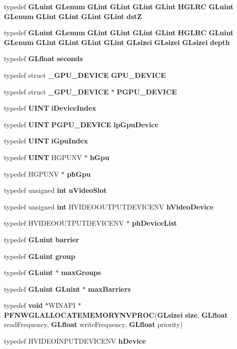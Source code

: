 \begin{DoxyCompactItemize}
\item 
typedef {\bf G\+Luint} {\bf G\+Lenum} {\bf G\+Lint} {\bf G\+Lint} {\bf G\+Lint} {\bf G\+Lint} {\bf H\+G\+L\+RC} {\bf G\+Luint} {\bf G\+Lenum} {\bf G\+Lint} {\bf G\+Lint} {\bf G\+Lint} {\bf G\+Lint} {\bf dstZ}
\item 
typedef {\bf G\+Luint} {\bf G\+Lenum} {\bf G\+Lint} {\bf G\+Lint} {\bf G\+Lint} {\bf G\+Lint} {\bf H\+G\+L\+RC} {\bf G\+Luint} {\bf G\+Lenum} {\bf G\+Lint} {\bf G\+Lint} {\bf G\+Lint} {\bf G\+Lint} {\bf G\+Lsizei} {\bf G\+Lsizei} {\bf G\+Lsizei} {\bf depth}
\item 
typedef {\bf G\+Lfloat} {\bf seconds}
\item 
typedef struct {\bf \+\_\+\+G\+P\+U\+\_\+\+D\+E\+V\+I\+CE} {\bf G\+P\+U\+\_\+\+D\+E\+V\+I\+CE}
\item 
typedef struct {\bf \+\_\+\+G\+P\+U\+\_\+\+D\+E\+V\+I\+CE} $\ast$ {\bf P\+G\+P\+U\+\_\+\+D\+E\+V\+I\+CE}
\item 
typedef {\bf U\+I\+NT} {\bf i\+Device\+Index}
\item 
typedef {\bf U\+I\+NT} {\bf P\+G\+P\+U\+\_\+\+D\+E\+V\+I\+CE} {\bf lp\+Gpu\+Device}
\item 
typedef {\bf U\+I\+NT} {\bf i\+Gpu\+Index}
\item 
typedef {\bf U\+I\+NT} H\+G\+P\+U\+NV $\ast$ {\bf h\+Gpu}
\item 
typedef H\+G\+P\+U\+NV $\ast$ {\bf ph\+Gpu}
\item 
typedef unsigned {\bf int} {\bf u\+Video\+Slot}
\item 
typedef unsigned {\bf int} H\+V\+I\+D\+E\+O\+O\+U\+T\+P\+U\+T\+D\+E\+V\+I\+C\+E\+NV {\bf h\+Video\+Device}
\item 
typedef H\+V\+I\+D\+E\+O\+O\+U\+T\+P\+U\+T\+D\+E\+V\+I\+C\+E\+NV $\ast$ {\bf ph\+Device\+List}
\item 
typedef {\bf G\+Luint} {\bf barrier}
\item 
typedef {\bf G\+Luint} {\bf group}
\item 
typedef {\bf G\+Luint} $\ast$ {\bf max\+Groups}
\item 
typedef {\bf G\+Luint} {\bf G\+Luint} $\ast$ {\bf max\+Barriers}
\item 
typedef {\bf void} $\ast$W\+I\+N\+A\+PI $\ast$ {\bf P\+F\+N\+W\+G\+L\+A\+L\+L\+O\+C\+A\+T\+E\+M\+E\+M\+O\+R\+Y\+N\+V\+P\+R\+OC}({\bf G\+Lsizei} {\bf size}, {\bf G\+Lfloat} read\+Frequency, {\bf G\+Lfloat} write\+Frequency, {\bf G\+Lfloat} priority)
\item 
typedef H\+V\+I\+D\+E\+O\+I\+N\+P\+U\+T\+D\+E\+V\+I\+C\+E\+NV {\bf h\+Device}

\end{DoxyCompactItemize}
